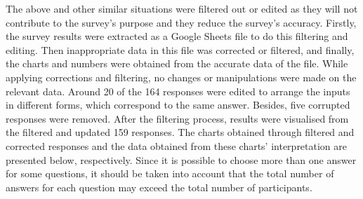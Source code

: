 The above and other similar situations were filtered out or edited as they will not contribute to the survey's purpose and they reduce the survey’s accuracy. Firstly, the survey results were extracted as a Google Sheets file to do this filtering and editing. Then inappropriate data in this file was corrected or filtered, and finally, the charts and numbers were obtained from the accurate data of the file. While applying corrections and filtering, no changes or manipulations were made on the relevant data. Around 20 of the 164 responses were edited to arrange the inputs in different forms, which correspond to the same answer. Besides, five corrupted responses were removed. After the filtering process, results were visualised from the filtered and updated 159 responses.  The charts obtained through filtered and corrected responses and the data obtained from these charts’ interpretation are presented below, respectively. Since it is possible to choose more than one answer for some questions, it should be taken into account that the total number of answers for each question may exceed the total number of participants.

